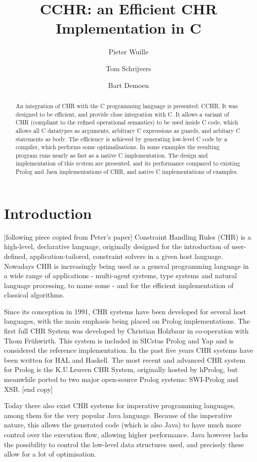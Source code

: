 \documentclass{llncs}
\title{CCHR: an Efficient CHR Implementation in C}
\author{Pieter Wuille \and Tom Schrijvers \and Bart Demoen}
\institute{Department of Computer Science, K.U.Leuven, Belgium}
\begin{document}
\maketitle

\begin{abstract}
An integration of CHR with the C programming language is presented: CCHR.
It was designed to be efficient, and provide close integration with C.
It allows a variant of CHR (compliant to the refined operational semantics)
to be used inside C code, which allows all C datatypes as arguments, arbitrary
C expressions as guards, and arbitary C statements as body.
The efficiency is achieved by generating low-level C code by a compiler, 
which performs some optimalisations. In some examples the resulting program
runs nearly as fast as a native C implementation.
The design and implementation of this system are presented, and its performance
compared to existing Prolog and Java implementations of CHR, and native C
implementations of examples.
\end{abstract}

\section{Introduction}

[following piece copied from Peter's paper] Constraint Handling Rules (CHR) is a
high-level, declarative language, originally designed for the introduction of
user-defined, application-tailored, constraint solvers in a given host language.
Nowadays CHR is increasingly being used as a general programming language in a
wide range of applications - multi-agent systems, type systems and natural
language processing, to name some - and for the efficient implementation of
classical algorithms.

Since its conception in 1991, CHR systems have been developed for several host
languages, with the main emphasis being placed on Prolog implementations.
The first full CHR System was developed by Christian Holzbaur in co-operation
with Thom Fr\"uhwirth. This system is included in SICstus Prolog and Yap and is
considered the reference implementation. In the past five years CHR systems have
been written for HAL and Haskell. The most recent and advanced CHR system for
Prolog is the K.U.Leuven CHR System, originally hosted by hProlog, but
meanwhile ported to two major open-source Prolog systems: SWI-Prolog and XSB.
[end copy]

Today there also exist CHR systems for imperative programming
languages, among them for the very popular Java language. Because of the imperative
nature, this allows the generated code (which is also Java) to have much more
control over the execution flow, allowing higher performance. Java however lacks
the possibility to control the low-level data structures used, and precisely these
allow for a lot of optimisation.
\end{document}
